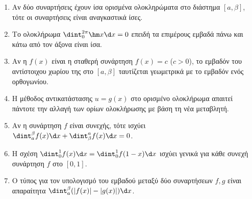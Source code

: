 \begin{enumerate}[label=\textbf{3.\arabic*.}]
    \item Αν δύο συναρτήσεις έχουν ίσα ορισμένα ολοκληρώματα στο διάστημα $[a,\beta]$, τότε οι συναρτήσεις είναι αναγκαστικά ίσες.
    \item Το ολοκλήρωμα $\dint_0^{2\pi} \hm x \d x = 0$ επειδή τα επιμέρους εμβαδά πάνω και κάτω από τον άξονα είναι ίσα.
    \item Αν η $f(x)$ είναι η σταθερή συνάρτηση $f(x)=c$ ($c>0$), το εμβαδόν του αντίστοιχου χωρίου της στο $[a, \beta]$ ταυτίζεται γεωμετρικά με το εμβαδόν ενός ορθογωνίου.
    \item Η μέθοδος αντικατάστασης $u = g(x)$ στο ορισμένο ολοκλήρωμα απαιτεί πάντοτε την αλλαγή των ορίων ολοκλήρωσης με βάση τη νέα μεταβλητή.
    \item Αν η συνάρτηση $f$ είναι συνεχής, τότε ισχύει $\dint_a^\beta f(x) \d x + \dint_\beta^a f(x) \d x = 0$.
    \item Η σχέση $\dint_0^1 f(x)\d x = \dint_0^1 f(1-x)\d x$ ισχύει γενικά για κάθε συνεχή συνάρτηση $f$ στο $[0,1]$.
    \item Ο τύπος για τον υπολογισμό του εμβαδού μεταξύ δύο συναρτήσεων $f, g$ είναι απαραίτητα $\dint_{a}^{\beta} (|f(x)| - |g(x)|) \d x$.
\end{enumerate}

